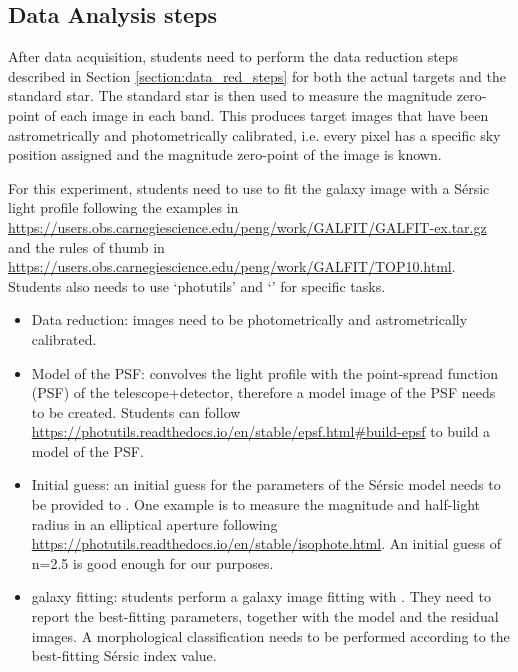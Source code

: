 \documentclass[a4paper, 11pt, fleqn]{memoir}
\begin{document}
\subsection{Data Analysis steps}

After data acquisition, students need to perform the data reduction steps described in Section \ref{section:data_red_steps} for both the actual targets and the standard star.
The standard star is then used to measure the magnitude zero-point of each image in each band.
This produces target images that have been astrometrically and photometrically calibrated, i.e. every pixel has a specific sky position assigned and the magnitude zero-point of the image is known.

For this experiment, students need to use  to fit the galaxy image with a S\'ersic light profile following the examples in \url{https://users.obs.carnegiescience.edu/peng/work/GALFIT/GALFIT-ex.tar.gz} and the rules of thumb in \url{https://users.obs.carnegiescience.edu/peng/work/GALFIT/TOP10.html}.
Students also needs to use `photutils' and `' for specific tasks.
\begin{itemize}
    \item
          Data reduction: images need to be photometrically and astrometrically
          calibrated.
    \item
          Model of the PSF:  convolves the light profile with the
          point-spread function (PSF) of the telescope+detector, therefore a model image
          of the PSF needs to be created.
          Students can follow \url{https://photutils.readthedocs.io/en/stable/epsf.html#build-epsf} to build a model of the PSF.
    \item
          Initial guess: an initial guess for the parameters of the S\'ersic model needs
          to be provided to .
          One example is to measure the magnitude and half-light radius in an elliptical aperture following \url{https://photutils.readthedocs.io/en/stable/isophote.html}.
          An initial guess of n=2.5 is good enough for our purposes.
    \item
          galaxy fitting: students perform a galaxy image fitting with .
          They need to report the best-fitting parameters, together with the model and the residual images.
          A morphological classification needs to be performed according to the best-fitting S\'ersic index value.
\end{itemize}
\end{document}
